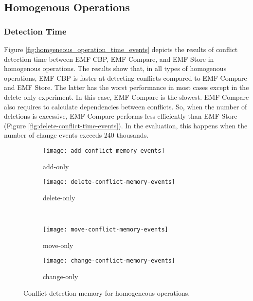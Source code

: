 \subsection{Homogenous Operations}
\label{sec:homogenous-operation_conflict}

\subsubsection{Detection Time} 
\label{sec:detection_time}
Figure \ref{fig:homgeneous_operation_time_events} depicts the results of conflict detection time between EMF CBP, EMF Compare, and EMF Store in homogenous operations. The results show that, in all types of homogenous operations, EMF CBP is faster at detecting conflicts compared to EMF Compare and EMF Store. The latter has the worst performance in most cases except in the delete-only experiment. In this case, EMF Compare is the slowest. EMF Compare also requires to calculate dependencies between conflicts. So, when the number of deletions is excessive, EMF Compare performs less efficiently than EMF Store (Figure \ref{fig:delete-conflict-time-events}). In the evaluation, this happens when the number of change events exceeds 240 thousands.

\begin{figure*}[ht]
  \centering
  \begin{subfigure}[t]{0.490\linewidth}
    \texttt{[image: add-conflict-memory-events]}
    \caption{add-only}
    \label{fig:add-conflict-memory-events}
  \end{subfigure}
  \hfill
  \begin{subfigure}[t]{0.490\linewidth}
    \texttt{[image: delete-conflict-memory-events]}
    \caption{delete-only}
    \label{fig:delete-conflict-memory-events}
  \end{subfigure}
  \\
  \begin{subfigure}[t]{0.490\linewidth}
    \texttt{[image: move-conflict-memory-events]}
    \caption{move-only}
    \label{fig:move-conflict-memory-events}
  \end{subfigure}
  \hfill
  \begin{subfigure}[t]{0.490\linewidth}
    \texttt{[image: change-conflict-memory-events]}
    \caption{change-only}
    \label{fig:change-conflict-memory-events}
  \end{subfigure}
  \caption{Conflict detection memory for homogeneous operations.}
  \label{fig:homgeneous_operation_memory_events}
\end{figure*}


